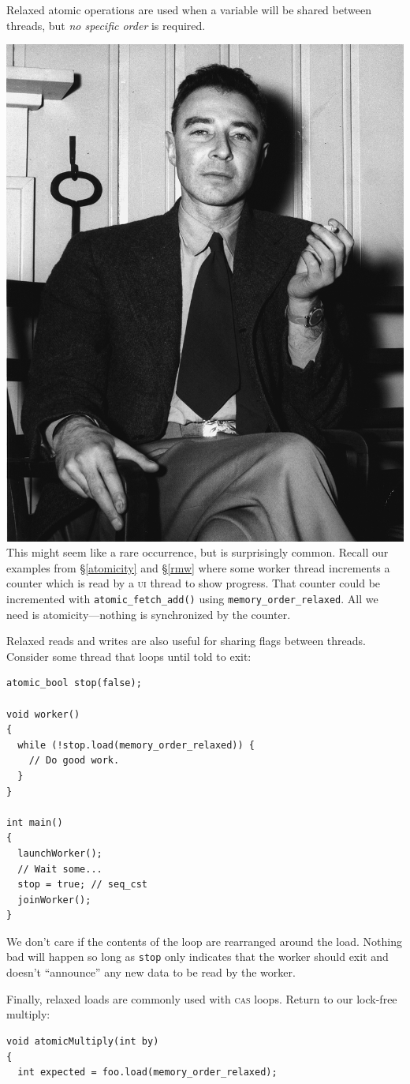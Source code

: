\documentclass[fontsize=10pt, numbers=endperiod]{scrartcl}
\newcommand{\codesize}{\fontsize{10pt}{12pt}}
\newcommand{\secref}[1]{\hyperref[#1]{\textsc{\S}\ref*{#1}}}
\newenvironment{colfigure}
  {\par\vspace{1\baselineskip minus 0.5\baselineskip}\noindent\minipage{\linewidth}}
  {\endminipage\vspace*{1\baselineskip minus 0.7\baselineskip}}
\begin{document}
\begin{multicols*}{2}
Relaxed atomic operations are used when a variable will be shared between threads,
but \emph{no specific order} is required.
\begin{colfigure}
\centering
\includegraphics[keepaspectratio,width=0.5\linewidth]{oppenheimer}
\label{oppenheimer}
\end{colfigure}
This might seem like a rare occurrence,
but is surprisingly common.
Recall our examples from \secref{atomicity} and \secref{rmw} where some worker
thread increments a counter which is read by a \textsc{ui} thread to show
progress.
That counter could be incremented with
\texttt{atomic\_fetch\_add()} using \texttt{memory\_order\_relaxed}.
All we need is atomicity---nothing is synchronized by the counter.

Relaxed reads and writes are also useful for sharing flags between threads.
Consider some thread that loops until told to exit:
\begin{colfigure}
\begin{verbatim}
atomic_bool stop(false);

void worker()
{
  while (!stop.load(memory_order_relaxed)) {
    // Do good work.
  }
}

int main()
{
  launchWorker();
  // Wait some...
  stop = true; // seq_cst
  joinWorker();
}
\end{verbatim}
\end{colfigure}
We don't care if the contents of the loop are rearranged around the load.
Nothing bad will happen so long as \texttt{stop} only indicates that the
worker should exit and doesn't ``announce'' any new data to be
read by the worker.

Finally, relaxed loads are commonly used with \textsc{cas} loops.
Return to our lock-free multiply:
\begin{colfigure}
\begin{verbatim}
void atomicMultiply(int by)
{
  int expected = foo.load(memory_order_relaxed);


\end{verbatim}
\end{colfigure}
\end{multicols*}
\end{document}
